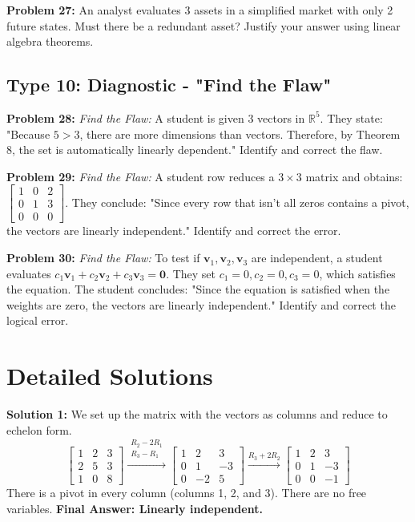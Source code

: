 \documentclass[12pt]{article}
\begin{document}
\textbf{Problem 27:} An analyst evaluates 3 assets in a simplified market with only 2 future states. Must there be a redundant asset? Justify your answer using linear algebra theorems.

\subsection*{Type 10: Diagnostic - "Find the Flaw"}
\textbf{Problem 28:} \textit{Find the Flaw:} A student is given 3 vectors in $\mathbb{R}^5$. They state: "Because $5 > 3$, there are more dimensions than vectors. Therefore, by Theorem 8, the set is automatically linearly dependent." Identify and correct the flaw.

\textbf{Problem 29:} \textit{Find the Flaw:} A student row reduces a $3 \times 3$ matrix and obtains:
$\begin{bmatrix} 1 & 0 & 2 \\ 0 & 1 & 3 \\ 0 & 0 & 0 \end{bmatrix}$. They conclude: "Since every row that isn't all zeros contains a pivot, the vectors are linearly independent." Identify and correct the error.

\textbf{Problem 30:} \textit{Find the Flaw:} To test if $\mathbf{v}_1, \mathbf{v}_2, \mathbf{v}_3$ are independent, a student evaluates $c_1\mathbf{v}_1 + c_2\mathbf{v}_2 + c_3\mathbf{v}_3 = \mathbf{0}$. They set $c_1=0, c_2=0, c_3=0$, which satisfies the equation. The student concludes: "Since the equation is satisfied when the weights are zero, the vectors are linearly independent." Identify and correct the logical error.

\newpage
\section{Detailed Solutions}

\textbf{Solution 1:} We set up the matrix with the vectors as columns and reduce to echelon form.
$$ \begin{bmatrix} 1 & 2 & 3 \\ 2 & 5 & 3 \\ 1 & 0 & 8 \end{bmatrix} \xrightarrow{\substack{R_2 - 2R_1 \\ R_3 - R_1}} \begin{bmatrix} 1 & 2 & 3 \\ 0 & 1 & -3 \\ 0 & -2 & 5 \end{bmatrix} \xrightarrow{R_3 + 2R_2} \begin{bmatrix} 1 & 2 & 3 \\ 0 & 1 & -3 \\ 0 & 0 & -1 \end{bmatrix} $$
There is a pivot in every column (columns 1, 2, and 3). There are no free variables. \textbf{Final Answer: Linearly independent.}
\end{document}
